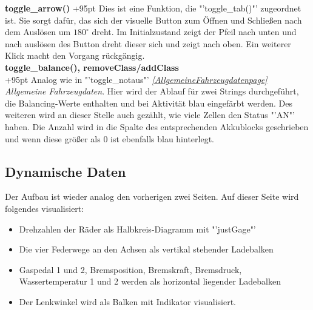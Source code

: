 \documentclass[fontsize = 12pt, paper = a4]{scrreprt}
\begin{document}
\textbf{toggle\_arrow()}
\hspace{1mm}
\hangindent+95pt  
Dies ist eine Funktion, die "'toggle\_tab()"' zugeordnet ist. Sie sorgt dafür, das sich der visuelle Button zum Öffnen und Schließen nach dem Auslösen um $180^\circ$  dreht. Im Initialzustand zeigt der Pfeil nach unten und nach auslösen des Button dreht dieser sich und zeigt nach oben. Ein weiterer Klick macht den Vorgang rückgängig.\\


\textbf{toggle\_balance(), removeClass/addClass}\\
\hangindent+95pt  
Analog wie in "'toggle\_notaus"' \textit{\ref{AllgemeineFahrzeugdatenpage} Allgemeine Fahrzeugdaten}. Hier wird der Ablauf für zwei Strings durchgeführt, die Balancing-Werte enthalten und bei Aktivität blau eingefärbt werden. Des weiteren wird an dieser Stelle auch gezählt, wie viele Zellen den Status "'AN"' haben. Die Anzahl wird in die Spalte des entsprechenden Akkublocks geschrieben und wenn diese größer als 0 ist ebenfalls blau hinterlegt.\\



\label{dynamischedatenpage}
\subsection{Dynamische Daten}
Der Aufbau ist wieder analog den vorherigen zwei Seiten. Auf dieser Seite wird folgendes visualisiert: 

\begin{itemize}
\item Drehzahlen der Räder als Halbkreis-Diagramm mit "'justGage"'
\item Die vier Federwege an den Achsen als vertikal stehender Ladebalken 
\item Gaspedal 1 und 2, Bremsposition, Bremskraft, Bremsdruck, Wassertemperatur 1 und 2 werden als horizontal liegender Ladebalken 
\item Der Lenkwinkel wird als Balken mit Indikator visualisiert.  
\end{itemize}
\end{document}
